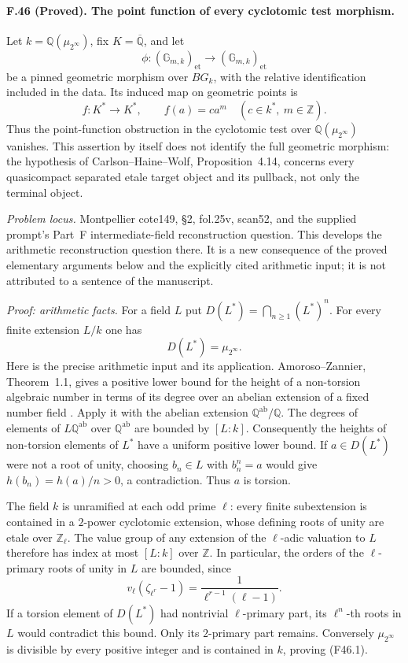 \paragraph{F.46 (Proved). The point function of every cyclotomic test morphism.}
Let $k=\mathbb Q(\mu_{2^\infty})$, fix $K=\overline{\mathbb Q}$, and let
\[
 \phi:(\mathbb G_{m,k})_{\mathrm{et}}
       \longrightarrow(\mathbb G_{m,k})_{\mathrm{et}}
\]
be a pinned geometric morphism over $B G_k$, with the relative
identification included in the data. Its induced map on geometric
points is
\[
 f:K^*\longrightarrow K^*,\qquad f(a)=c a^m
 \quad(c\in k^*,\ m\in\mathbb Z).
 \tag{F46}
\]
Thus the point-function obstruction in the cyclotomic test over
$\mathbb Q(\mu_{2^\infty})$ vanishes. This assertion by itself does not identify the full geometric
morphism: the hypothesis of Carlson--Haine--Wolf,
Proposition~4.14, concerns every quasicompact separated etale target
object and its pullback, not only the terminal object.

\emph{Problem locus.} Montpellier cote149, \S2, fol.25v, scan52,
and the supplied prompt's Part~F intermediate-field reconstruction question.
This develops the arithmetic reconstruction question there.
It is a new consequence of the proved elementary arguments
below and the explicitly cited arithmetic input; it is not attributed
to a sentence of the manuscript.

\emph{Proof: arithmetic facts.}
For a field $L$ put $D(L^*)=\bigcap_{n\geq1}(L^*)^n$.
For every finite extension $L/k$ one has
\[
 D(L^*)=\mu_{2^\infty}.                                      \tag{F46.1}
\]
Here is the precise arithmetic input and its application.
Amoroso--Zannier, Theorem~1.1, gives a positive lower bound for the
height of a non-torsion algebraic number in terms of its degree over
an abelian extension of a fixed number field
\cite{AmorosoZannier2000}. Apply it with the abelian extension
$\mathbb Q^{\mathrm{ab}}/\mathbb Q$. The degrees of elements of
$L\mathbb Q^{\mathrm{ab}}$ over $\mathbb Q^{\mathrm{ab}}$ are bounded
by $[L:k]$. Consequently the heights of non-torsion elements of $L^*$
have a uniform positive lower bound. If $a\in D(L^*)$ were not a root
of unity, choosing $b_n\in L$ with $b_n^n=a$ would give
$h(b_n)=h(a)/n>0$, a contradiction. Thus $a$ is torsion.

The field $k$ is unramified at each odd prime $\ell$: every finite
subextension is contained in a $2$-power cyclotomic extension, whose
defining roots of unity are etale over $\mathbb Z_\ell$. The value
group of any extension of the $\ell$-adic valuation to $L$ therefore
has index at most $[L:k]$ over $\mathbb Z$. In particular, the orders
of the $\ell$-primary roots of unity in $L$ are bounded, since
\[
 v_\ell(\zeta_{\ell^r}-1)
       =\frac{1}{\ell^{r-1}(\ell-1)}.
\]
If a torsion element of $D(L^*)$ had nontrivial $\ell$-primary part,
its $\ell^n$-th roots in $L$ would contradict this bound. Only its
$2$-primary part remains. Conversely $\mu_{2^\infty}$ is divisible
by every positive integer and is contained in $k$, proving (F46.1).

